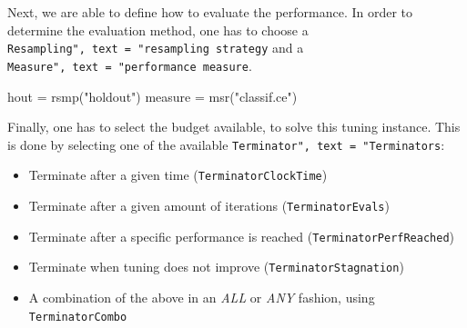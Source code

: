 \documentclass[
  11pt,
  parskip=half,
  DIV=calc,
  BCOR=10mm,
  x11names]{scrbook}
\newenvironment{Shaded}{}{}
\newcommand{\DataTypeTok}[1]{#1}
\newcommand{\DecValTok}[1]{#1}
\newcommand{\FloatTok}[1]{#1}
\newcommand{\KeywordTok}[1]{\textcolor[rgb]{0.00,0.00,1.00}{#1}}
\newcommand{\NormalTok}[1]{#1}
\newcommand{\OperatorTok}[1]{#1}
\newcommand{\StringTok}[1]{\textcolor[rgb]{0.00,0.50,0.50}{#1}}
\providecommand{\tightlist}{%
  \setlength{\itemsep}{0pt}\setlength{\parskip}{0pt}}
\begin{document}
\begin{Shaded}
\end{Shaded}

Next, we are able to define how to evaluate the performance.
In order to determine the evaluation method, one has to choose a \texttt{Resampling",\ text\ =\ "resampling\ strategy} and a \texttt{Measure",\ text\ =\ "performance\ measure}.

\begin{Shaded}
\begin{Highlighting}[]
\NormalTok{hout =}\StringTok{ }\KeywordTok{rsmp}\NormalTok{(}\StringTok{"holdout"}\NormalTok{)}
\NormalTok{measure =}\StringTok{ }\KeywordTok{msr}\NormalTok{(}\StringTok{"classif.ce"}\NormalTok{)}
\end{Highlighting}
\end{Shaded}

Finally, one has to select the budget available, to solve this tuning instance.
This is done by selecting one of the available \texttt{Terminator",\ text\ =\ "Terminators}:

\begin{itemize}
\tightlist
\item
  Terminate after a given time (\texttt{TerminatorClockTime})
\item
  Terminate after a given amount of iterations (\texttt{TerminatorEvals})
\item
  Terminate after a specific performance is reached (\texttt{TerminatorPerfReached})
\item
  Terminate when tuning does not improve (\texttt{TerminatorStagnation})
\item
  A combination of the above in an \emph{ALL} or \emph{ANY} fashion, using \texttt{TerminatorCombo}
\end{itemize}
\end{document}
